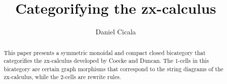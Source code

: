 %
%



\usepackage[backend=bibtex,citestyle=numeric]{biblatex}


% 

%

\begin{abstract}
	This paper presents a symmetric monoidal and compact closed bicategory that categorifies the zx-calculus developed by Coecke and Duncan.  The $1$-cells in this bicategory are certain graph morphisms that correspond to the string diagrams of the zx-calculus, while the $2$-cells are rewrite rules.
\end{abstract}

\title{Categorifying the zx-calculus}
\author{Daniel Cicala}
\maketitle







\appendix


\printbibliography 
 
% 

%
